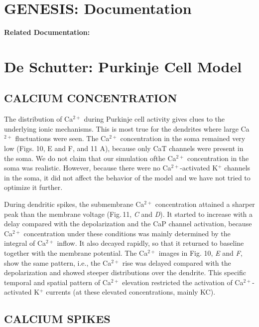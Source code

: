 \documentclass[12pt]{article}
\begin{document}
\section*{GENESIS: Documentation}

{\bf Related Documentation:}

\section*{De Schutter: Purkinje Cell Model}

\subsection*{CALCIUM CONCENTRATION}

The distribution of Ca$^{2+}$ during
Purkinje cell activity gives clues to the underlying ionic
mechanisms. This is most true for the dendrites where large
Ca$^{2+}$ fluctuations were seen. The Ca$^{2+}$ concentration in the
soma remained very low (Figs. 10, E and F, and 11 A),
because only CaT channels were present in the soma. We
do not claim that our simulation ofthe Ca$^{2+}$ concentration
in the soma was realistic. However, because there were no
Ca$^{2+}$-activated K$^+$ channels in the soma, it did not affect
the behavior of the model and we have not tried to optimize it
further.

During dendritic spikes, the submembrane Ca$^{2+}$ concentration 
attained a sharper peak than the membrane voltage
(Fig.\,11, {\it C} and {\it D}). It started to increase with a delay 
compared with the depolarization and the CaP channel activation, because Ca$^{2+}$ concentration under these conditions was mainly determined by the integral of Ca$^{2+}$ inflow. It
also decayed rapidly, so that it returned to baseline together
with the membrane potential. The Ca$^{2+}$ images in Fig. 10,
{\it E} and {\it F}, show the same pattern, i.e., the Ca$^{2+}$ rise was
delayed compared with the depolarization and showed
steeper distributions over the dendrite. This specific temporal
and spatial pattern of Ca$^{2+}$ elevation restricted the
activation of Ca$^{2+}$-activated K$^+$ currents (at these elevated
concentrations, mainly KC).

\subsection*{CALCIUM SPIKES}
\end{document}
